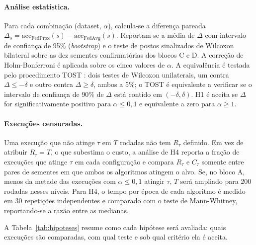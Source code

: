 \paragraph{Análise estatística.} Para cada combinação (dataset, $\alpha$), calcula-se a diferença pareada $\Delta_s = \text{acc}_{\text{FedProx}}(s) - \text{acc}_{\text{FedAvg}}(s)$. Reportam-se a média de $\Delta$ com intervalo de confiança de 95\% (\textit{bootstrap}) e o teste de postos sinalizados de Wilcoxon bilateral \citep{wilcoxon1945} sobre as dez sementes confirmatórias dos blocos C e D. A correção de Holm-Bonferroni é aplicada sobre os cinco valores de $\alpha$. A equivalência é testada pelo procedimento TOST \citep{schuirmann1987tost}: dois testes de Wilcoxon unilaterais, um contra $\Delta \leq -\delta$ e outro contra $\Delta \geq \delta$, ambos a 5\%; o TOST é equivalente a verificar se o intervalo de confiança de 90\% de $\Delta$ está contido em $(-\delta, \delta)$. H1 é aceita se $\Delta$ for significativamente positivo para $\alpha \leq 0{,}1$ e equivalente a zero para $\alpha \geq 1$.

\paragraph{Execuções censuradas.} Uma execução que não atinge $\tau$ em $T$ rodadas não tem $R_\tau$ definido. Em vez de atribuir $R_\tau = T$, o que subestima o custo, a análise de H4 reporta a fração de execuções que atinge $\tau$ em cada configuração e compara $R_\tau$ e $C_\tau$ somente entre pares de sementes em que ambos os algoritmos atingem o alvo. Se, no bloco A, menos da metade das execuções com $\alpha \leq 0{,}1$ atingir $\tau$, $T$ será ampliado para 200 rodadas nesses níveis. Para H4, o tempo por época de cada algoritmo é medido em 30 repetições independentes e comparado com o teste de Mann-Whitney, reportando-se a razão entre as medianas.

A Tabela~\ref{tab:hipoteses} resume como cada hipótese será avaliada: quais execuções são comparadas, com qual teste e sob qual critério ela é aceita.

